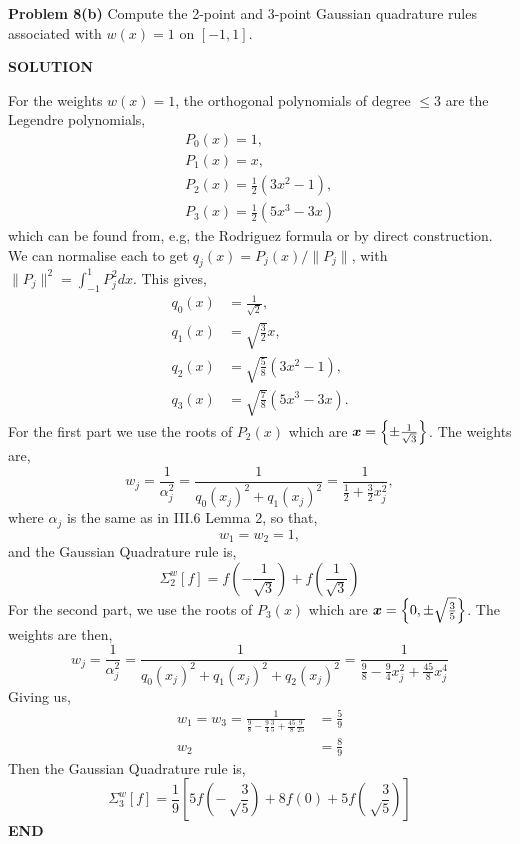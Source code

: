 \documentclass[12pt,a4paper]{article}
\def\x{ {\vc x} }
\begin{document}
\textbf{Problem 8(b)} Compute the 2-point and 3-point Gaussian quadrature rules associated with $w(x) = 1$ on $[-1,1]$.

\textbf{SOLUTION}

For the weights $w(x) = 1$, the orthogonal polynomials of degree $\ensuremath{\leq} 3$ are the Legendre polynomials,
\begin{align*}
	P_0(x) = 1, \\
	P_1(x) = x, \\
	P_2(x) = \frac{1}{2}(3x^2  - 1), \\
	P_3(x) = \frac{1}{2}(5x^3 - 3x)
\end{align*}
which can be found from, e.g, the Rodriguez formula or by direct construction. We can normalise each to get $q_j(x) = P_j(x)/\|P_j\|$, with $\|P_j\|^2 = \int_{-1}^1 P_j^2 dx$. This gives,
\begin{align*}
	q_0(x) &= \frac{1}{\sqrt{2}}, \\
	q_1(x) &= \sqrt{\frac{3}{2}}x, \\
	q_2(x) &= \sqrt{\frac{5}{8}}(3x^2  - 1), \\
	q_3(x) &= \sqrt{\frac{7}{8}}(5x^3 - 3x).
\end{align*}
For the first part we use the roots of $P_2(x)$ which are $\ensuremath{\bm{\x}} = \left\{\ensuremath{\pm} \frac{1}{\sqrt{3}}\right\}$. The weights are,
\[
w_j = \frac{1}{\ensuremath{\alpha}_j^2} = \frac{1}{q_0(x_j)^2 + q_1(x_j)^2} = \frac{1}{\frac{1}{2}+\frac{3}{2}x_j^2},
\]
where $\ensuremath{\alpha}_j$ is the same as in III.6 Lemma 2, so that,
\[
w_1 = w_2 = 1,
\]
and the Gaussian Quadrature rule is,
\[
\ensuremath{\Sigma}_2^w[f] = f\left(-\frac{1}{\sqrt{3}}\right) + f\left(\frac{1}{\sqrt{3}}\right)
\]
For the second part, we use the roots of $P_3(x)$ which are $\ensuremath{\bm{\x}} = \left\{0, \ensuremath{\pm} \sqrt{\frac{3}{5}} \right\}$. The weights are then,
\[
w_j = \frac{1}{\ensuremath{\alpha}_j^2} = \frac{1}{q_0(x_j)^2 + q_1(x_j)^2 + q_2(x_j)^2} = \frac{1}{\frac{9}{8} -\frac{9}{4}x_j^2 + \frac{45}{8}x_j^4 }
\]
Giving us,
\begin{align*}
	w_1 = w_3 = \frac{1}{\frac{9}{8} - \frac{9}{4}\frac{3}{5} + \frac{45}{8}\frac{9}{25}} &= \frac{5}{9} \\
	w_2 &= \frac{8}{9}
\end{align*}
Then the Gaussian Quadrature rule is,
\[
\ensuremath{\Sigma}_3^w[f] = \frac{1}{9} \left[5f\left(-\sqrt\frac{3}{5}\right) +8f(0) + 5f\left(\sqrt\frac{3}{5}\right) \right]
\]
\textbf{END}
\end{document}
